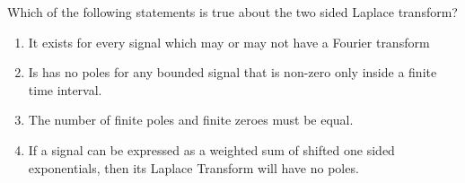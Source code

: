\item Which of the following statements is true about the two sided Laplace transform?
\begin{enumerate}
    \item It exists for every signal which may or may not have a Fourier transform
    \item Is has no poles for any bounded signal that is non-zero only inside a finite time interval.
    \item The number of finite poles and finite zeroes must be equal.
    \item If a signal can be expressed as a weighted sum of shifted one sided exponentials, then its Laplace Transform will have no poles.
\end{enumerate}


